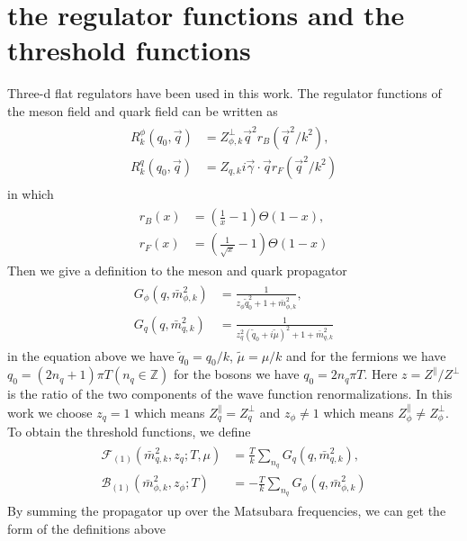 \documentclass[%
reprint,
superscriptaddress,
showpacs,preprintnumbers,
 amsmath,amssymb,
 aps,
prd,
]{revtex4-1}
\begin{document}
\section{the regulator functions and the threshold functions}\label{a}
Three-d flat regulators have been used in this work. The regulator functions of the meson field and quark field can be 
written as
\begin{align}
\begin{split}
R^{\phi}_{k}(q_0,\vec{q})&=Z^{\bot}_{\phi,k}\vec{q}^2r_B(\vec{q}^2/k^2) ,\\
R^{q}_{k}(q_0,\vec{q})&=Z_{q,k}i\vec{\gamma}\cdot\vec{q}r_F(\vec{q}^2/k^2)
\end{split}
\end{align} 
in which
\begin{align}
\begin{split}
r_B(x)&=\left( \frac{1}{x}-1 \right)\Theta(1-x) ,\\
r_F(x)&=\left( \frac{1}{\sqrt{x}}-1 \right)\Theta(1-x)
\end{split}
\end{align} 
Then we give a definition to the meson and quark propagator
\begin{align}
\begin{split}
G_\phi(q,\bar{m}^{2}_{\phi,k})&=\frac{1}{z_\phi\tilde{q}^{2}_{0}+1+\bar{m}^{2}_{\phi,k}} ,\\
G_q(q,\bar{m}^{2}_{q,k})&=\frac{1}{z^{2}_{q}(\tilde{q}_0+i\tilde{\mu})^2+1+\bar{m}^{2}_{q,k}}
\end{split}
\end{align} 
in the equation above we have $\tilde{q}_0=q_0/k$, $\tilde{\mu}=\mu/k$ and for the fermions we have
$q_0=(2n_q+1)\pi T (n_q\in \mathbb{Z})$ for the bosons we have $q_0=2n_q\pi T$. Here $z=Z^\|/Z^\bot$ is the ratio of the 
two components of the wave function renormalizations. In this work we choose $z_q=1$ which means $Z^{\|}_{q}=
Z^{\bot}_{q}$ and $z_\phi\neq 1$ which means $Z^{\|}_{\phi}\neq Z^{\bot}_{\phi}$. To obtain the threshold functions, we 
define
\begin{align}
\begin{split}
\mathcal{F}_{(1)}(\bar{m}^{2}_{q,k},z_q;T,\mu)&=\frac{T}{k}\sum_{n_q}G_q(q,\bar{m}^{2}_{q,k}),\\
\mathcal{B}_{(1)}(\bar{m}^{2}_{\phi,k},z_\phi;T)&=-\frac{T}{k}\sum_{n_q}G_\phi(q,\bar{m}^{2}_{\phi,k})
\end{split}
\end{align} 
By summing the propagator up over the Matsubara frequencies, we can get the form of the definitions above
\end{document}
